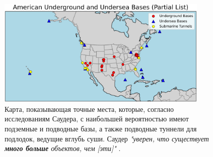 \documentclass[10pt,twocolumn,letterpaper]{article}
\begin{document}
\begin{figure}[t]
\begin{center}
\includegraphics[width=0.9\textwidth]{basescrop.png}
\end{center}
   \caption{Карта, показывающая точные места, которые, согласно исследованиям Саудера, с наибольшей вероятностью имеют подземные и подводные базы, а также подводные туннели для подлодок, ведущие вглубь суши. Саудер \textit{"уверен, что существует \textbf{много больше} объектов, чем [эти]"} \cite{22}.}
   \label{fig:4}
\end{figure}
\end{document}
